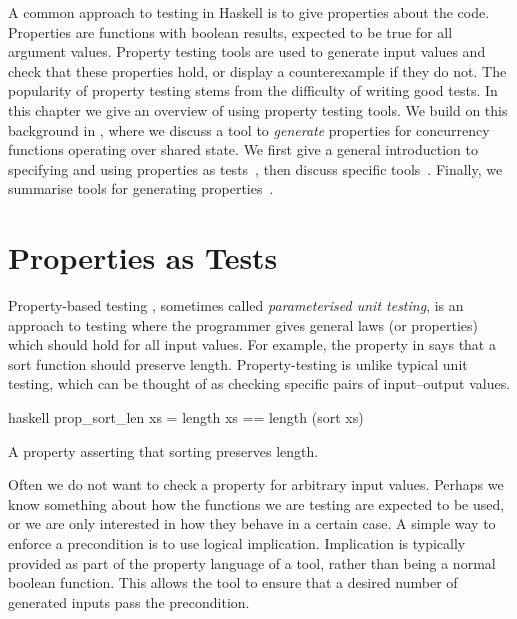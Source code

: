 A common approach to testing in Haskell is to give properties about
the code.  Properties are functions with boolean results, expected to
be true for all argument values.  Property testing tools are used to
generate input values and check that these properties hold, or display
a counterexample if they do not.  The popularity of property testing
stems from the difficulty of writing good tests.  In this chapter we
give an overview of using property testing tools.  We build on this
background in , where we discuss a tool to
\emph{generate} properties for concurrency functions operating over
shared state.  We first give a general introduction to specifying and
using properties as tests~, then discuss
specific tools~.  Finally, we summarise
tools for generating properties~.

\section{Properties as Tests}
\label{sec:property_testing-intro}

Property-based testing \parencite{claessen2000}, sometimes called
\emph{parameterised unit testing}, is an approach to testing where the
programmer gives general laws (or properties) which should hold for
all input values.  For example, the property in
 says that a sort function should preserve
length.  Property-testing is unlike typical unit testing, which can be
thought of as checking specific pairs of input--output values.

\begin{listing}
\centering
\begin{cminted}{haskell}
prop_sort_len xs = length xs == length (sort xs)
\end{cminted}
\caption{A property asserting that sorting preserves length.}\label{lst:prop_sort_len}
\end{listing}

Often we do not want to check a property for arbitrary input values.
Perhaps we know something about how the functions we are testing are
expected to be used, or we are only interested in how they behave in a
certain case.  A simple way to enforce a precondition is to use
logical implication.  Implication is typically provided as part of the
property language of a tool, rather than being a normal boolean
function.  This allows the tool to ensure that a desired number of
generated inputs pass the precondition.

